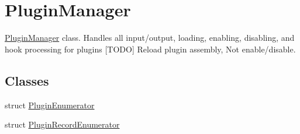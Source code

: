 \hypertarget{classOTA_1_1PluginManager}{}\section{Plugin\+Manager}
\label{classOTA_1_1PluginManager}


\hyperlink{classOTA_1_1PluginManager}{Plugin\+Manager} class. Handles all input/output, loading, enabling, disabling, and hook processing for plugins \mbox{[}T\+O\+D\+O\mbox{]} Reload plugin assembly, Not enable/disable.  


\subsection*{Classes}
\begin{DoxyCompactItemize}
\item 
struct \hyperlink{structOTA_1_1PluginManager_1_1PluginEnumerator}{Plugin\+Enumerator}
\item 
struct \hyperlink{structOTA_1_1PluginManager_1_1PluginRecordEnumerator}{Plugin\+Record\+Enumerator}
\end{DoxyCompactItemize}
